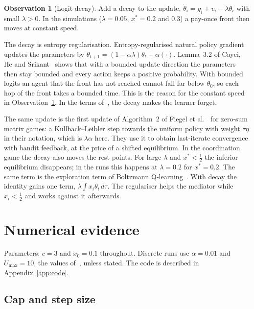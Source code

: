\documentclass[11pt,a4paper]{article}
\theoremstyle{definition}
\newtheorem{observation}{Observation}
\theoremstyle{plain}
\newcommand{\xs}{x^{*}}
\begin{document}
\begin{observation}[Logit decay]\label{obs:decay}
Add a decay to the update, $\dot\theta_i=g_i+v_i-\lambda\theta_i$ with small $\lambda>0$. In the simulations ($\lambda=0.05$, $\xs=0.2$ and $0.3$) a pay-once front then moves at constant speed.
\end{observation}

The decay is entropy regularisation. Entropy-regularised natural policy gradient updates the parameters by $\theta_{t+1}=(1-\alpha\lambda)\theta_t+\alpha(\cdot)$. Lemma~3.2 of Cayci, He and Srikant~\cite{cayci2021} shows that with a bounded update direction the parameters then stay bounded and every action keeps a positive probability. With bounded logits an agent that the front has not reached cannot fall far below $\theta_0$, so each hop of the front takes a bounded time. This is the reason for the constant speed in Observation~\ref{obs:decay}. In the terms of~\cite{cai2024}, the decay makes the learner forget.

The same update is the first update of Algorithm~2 of Fiegel et al.~\cite{fiegel2025} for zero-sum matrix games: a Kullback--Leibler step towards the uniform policy with weight $\tau\eta$ in their notation, which is $\lambda\alpha$ here. They use it to obtain last-iterate convergence with bandit feedback, at the price of a shifted equilibrium. In the coordination game the decay also moves the rest points. For large $\lambda$ and $\xs<\tfrac12$ the inferior equilibrium disappears; in the runs this happens at $\lambda=0.2$ for $\xs=0.2$. The same term is the exploration term of Boltzmann Q-learning~\cite{kianercy2012,bloembergen2015}. With decay the identity gains one term, $\lambda\int x_i\theta_i\,d\tau$. The regulariser helps the mediator while $x_i<\tfrac12$ and works against it afterwards.

\section{Numerical evidence}\label{sec:numerics}

Parameters: $c=3$ and $x_0=0.1$ throughout. Discrete runs use $\alpha=0.01$ and $U_{\max}=10$, the values of~\cite{huang2025}, unless stated. The code is described in Appendix~\ref{app:code}.

\subsection{Cap and step size}\label{sec:capstep}
\end{document}
